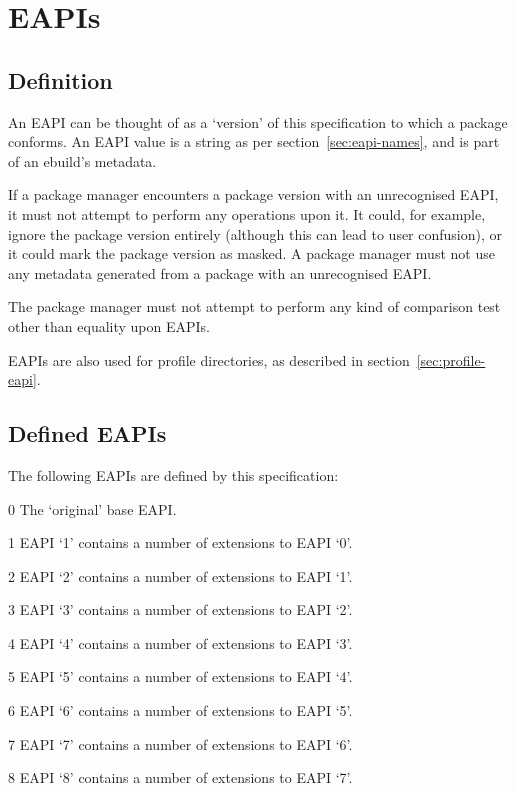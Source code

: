 \chapter{EAPIs}

\section{Definition}

An EAPI can be thought of as a `version' of this specification to which a package conforms. An EAPI
value is a string as per section~\ref{sec:eapi-names}, and is part of an ebuild's metadata.

If a package manager encounters a package version with an unrecognised EAPI, it must not attempt to
perform any operations upon it. It could, for example, ignore the package version entirely (although
this can lead to user confusion), or it could mark the package version as masked. A package manager
must not use any metadata generated from a package with an unrecognised EAPI.

The package manager must not attempt to perform any kind of comparison test other than equality upon
EAPIs.

EAPIs are also used for profile directories, as described in section~\ref{sec:profile-eapi}.

\section{Defined EAPIs}

The following EAPIs are defined by this specification:

\begin{compactdesc}
\item[0] The `original' base EAPI.
\item[1] EAPI `1' contains a number of extensions to EAPI `0'.
\item[2] EAPI `2' contains a number of extensions to EAPI `1'.
\item[3] EAPI `3' contains a number of extensions to EAPI `2'.
\item[4] EAPI `4' contains a number of extensions to EAPI `3'.
\item[5] EAPI `5' contains a number of extensions to EAPI `4'.
\item[6] EAPI `6' contains a number of extensions to EAPI `5'.
\item[7] EAPI `7' contains a number of extensions to EAPI `6'.
\item[8] EAPI `8' contains a number of extensions to EAPI `7'.
\end{compactdesc}

